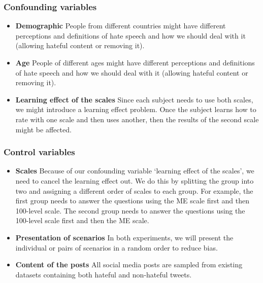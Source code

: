 \documentclass[a4paper]{article}
\begin{document}
\subsubsection{Confounding variables}
\begin{itemize}
    \item \textbf{Demographic} People from different countries might have different perceptions and definitions of hate speech and how we should deal with it (allowing hateful content or removing it).
    \item \textbf{Age} People of different ages might have different perceptions and definitions of hate speech and how we should deal with it (allowing hateful content or removing it).
    \item \textbf{Learning effect of the scales} Since each subject needs to use both scales, we might introduce a learning effect problem. Once the subject learns how to rate with one scale and then uses another, then the results of the second scale might be affected.
\end{itemize}

\subsubsection{Control variables}
\begin{itemize}
    \item \textbf{Scales} Because of our confounding variable ‘learning effect of the scales’, we need to cancel the learning effect out. We do this by splitting the group into two and assigning a different order of scales to each group. For example, the first group needs to answer the questions using the ME scale first and then 100-level scale. The second group needs to answer the questions using the 100-level scale first and then the ME scale.
    \item \textbf{Presentation of scenarios} In both experiments, we will present the individual or pairs of scenarios in a random order to reduce bias.
    \item \textbf{Content of the posts} All social media posts are sampled from existing datasets containing both hateful and non-hateful tweets.
\end{itemize}
\end{document}

